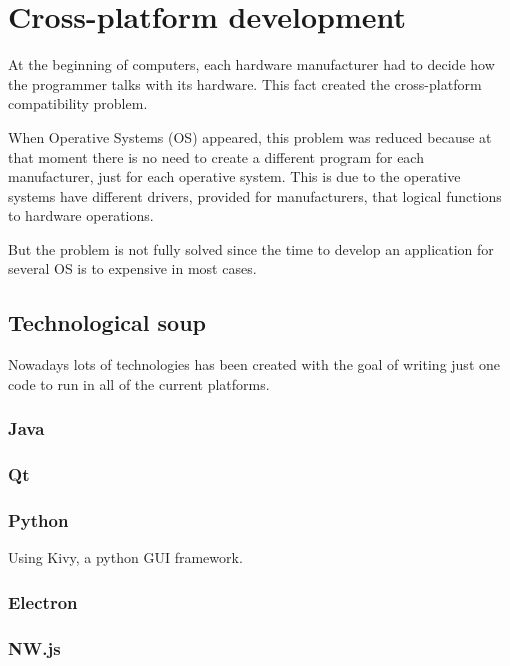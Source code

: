 \chapter{Cross-platform development}

\cite{soft-that-lasts}

At the beginning of computers, each hardware manufacturer had to decide how the
programmer talks with its hardware. This fact created the cross-platform
compatibility problem.

When Operative Systems (OS) appeared, this problem was reduced because at that
moment there is no need to create a different program for each manufacturer,
just for each operative system. This is due to the operative systems have
different drivers, provided for manufacturers, that logical functions to
hardware operations.

But the problem is not fully solved since the time to develop an application
for several OS is to expensive in most cases.

\section{Technological soup}

Nowadays lots of technologies has been created with the goal of writing just
one code to run in all of the current platforms.

\subsection{Java}

\subsection{Qt}

\subsection{Python}

Using Kivy, a python GUI framework.

\subsection{Electron}

\subsection{NW.js}

